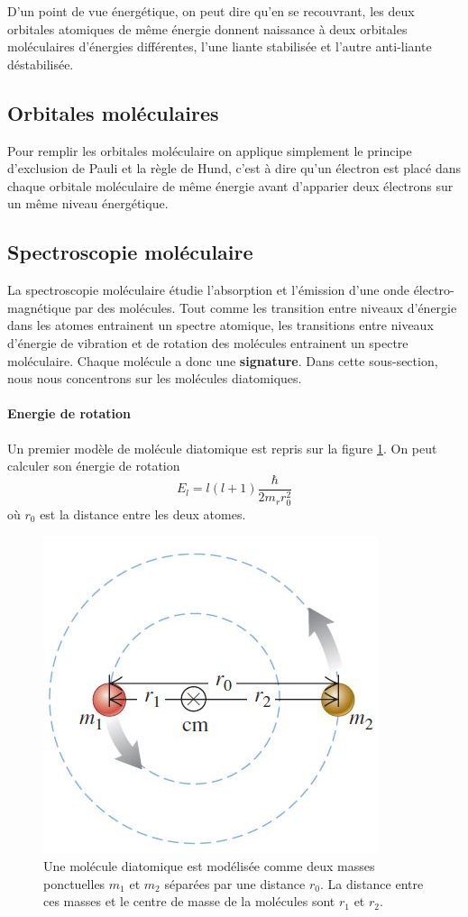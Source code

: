 D'un point de vue énergétique, on peut dire qu'en se
recouvrant, les deux orbitales atomiques de même énergie
donnent naissance à deux orbitales moléculaires d'énergies
différentes, l'une liante stabilisée et l'autre anti-liante
déstabilisée.

\subsection{Orbitales moléculaires}
Pour remplir les orbitales moléculaire on applique
simplement le principe d'exclusion de Pauli et
la règle de Hund, c'est à dire qu'un électron
est placé dans chaque orbitale moléculaire de
même énergie avant d'apparier deux électrons sur
un même niveau énergétique.

\subsection{Spectroscopie moléculaire}
La spectroscopie moléculaire étudie l'absorption
et l'émission d'une onde électro-magnétique par 
des molécules. Tout comme les transition entre niveaux
d'énergie dans les atomes entrainent un spectre atomique,
les transitions entre niveaux d'énergie de vibration
et de rotation des molécules entrainent un spectre moléculaire. 
Chaque molécule a donc une \textbf{signature}.
Dans cette sous-section, nous nous concentrons sur les
molécules diatomiques.

\paragraph{Energie de rotation}
Un premier modèle de molécule diatomique est repris
sur la figure \ref{fig:mol-dia1}. On peut calculer
son énergie de rotation
\[ E_l = l(l+1) \frac{\hbar}{2m_rr_0^2} \]
où $r_0$ est la distance entre les deux atomes.

\begin{figure}[ht]
	\centering
	\includegraphics[scale=0.7]{img/mol-dia1.jpg}
	\caption{Une molécule diatomique est modélisée
	comme deux masses ponctuelles $m_1$ et $m_2$
	séparées par une distance $r_0$. La distance entre
	ces masses et le centre de masse de la molécules
	sont $r_1$ et $r_2$.}
	\label{fig:mol-dia1}
\end{figure}

